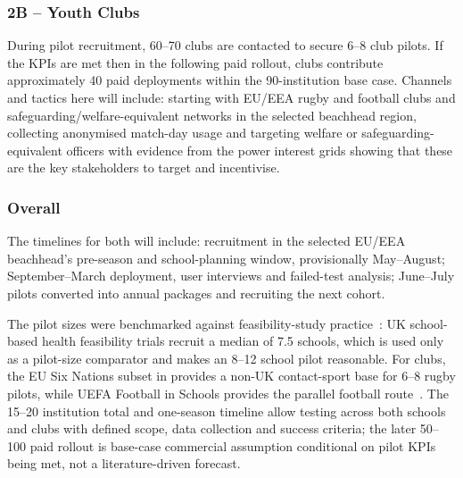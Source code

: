 \subsubsection{2B -- Youth Clubs}

During pilot recruitment, 60--70 clubs are contacted to secure 6--8 club pilots. If the KPIs are met then in the following paid rollout, clubs contribute approximately 40 paid deployments within the 90-institution base case. Channels and tactics here will include: starting with EU/EEA rugby and football clubs and safeguarding/welfare-equivalent networks in the selected beachhead region, collecting anonymised match-day usage and targeting welfare or safeguarding-equivalent officers with evidence from the power interest grids showing that these are the key stakeholders to target and incentivise.

\subsubsection{Overall}

The timelines for both will include: recruitment in the selected EU/EEA beachhead's pre-season and school-planning window, provisionally May--August; September--March deployment, user interviews and failed-test analysis; June--July pilots converted into annual packages and recruiting the next cohort.

The pilot sizes were benchmarked against feasibility-study practice~\cite{parker2022schoolfeasibility}: UK school-based health feasibility trials recruit a median of 7.5 schools, which is used only as a pilot-size comparator and makes an 8--12 school pilot reasonable. For clubs, the EU Six Nations subset in  provides a non-UK contact-sport base for 6--8 rugby pilots, while UEFA Football in Schools provides the parallel football route~\cite{uefa2025schools,worldrugby2020participationmap}. The 15--20 institution total and one-season timeline allow testing across both schools and clubs with defined scope, data collection and success criteria; the later 50--100 paid rollout is base-case commercial assumption conditional on pilot KPIs being met, not a literature-driven forecast.

